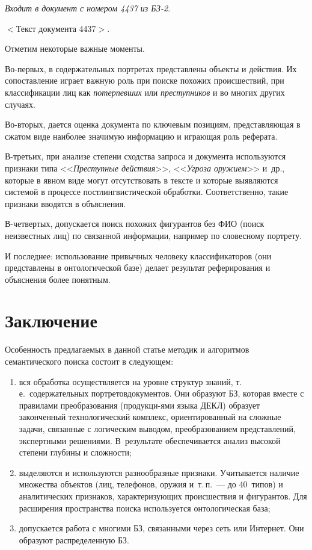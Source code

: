 \begin{multicols}{2}
     \textit{Входит в документ с номером 4437 из БЗ-2}.
     
    \noindent
     $<$Текст документа 4437$>$.
     
          \smallskip
     
    Отметим некоторые важные моменты.
    
    Во-первых, в содержательных портретах представлены объекты и 
действия. Их сопоставление играет важную роль при поиске похожих 
происшествий, при классификации лиц как \textit{потерпевших} или 
\textit{преступников} и во многих других случаях.
    
    Во-вторых, дается оценка документа по ключевым позициям, 
представляющая в сжатом виде наиболее значимую информацию и играющая 
роль реферата.
    
    В-третьих, при анализе степени сходства запроса и документа 
используются признаки типа <<\textit{Преступные действия}>>, <<\textit{Угроза 
оружием}>> и~др., которые в явном виде могут отсутствовать в тексте и 
которые выявляются системой в процессе постлингвистической обработки. 
Соответственно, такие признаки вводятся в объяснения.
    
    В-четвертых, допускается поиск похожих фигурантов без ФИО (поиск 
неизвестных лиц) по связанной информации, например по словесному 
портрету.
    
    И последнее: использование привычных человеку классификаторов (они 
представлены в онтологической базе) делает результат реферирования и 
объяснения более понятным.
    
\section{Заключение}
    
    Особенность предлагаемых в данной статье методик и алгоритмов 
семантического поиска состоит в следующем:
    \begin{enumerate}[(1)]
    \item вся обработка осуществляется на уровне структур знаний, т.\,е.\ 
содержательных портретов\linebreak документов. Они образуют БЗ, 
которая вмес\-те с правилами преобразования (продукци-\linebreak ями языка ДЕКЛ) 
образует законченный технологический комплекс, ориентированный на 
сложные задачи, связанные с логическим выводом, преобразованием 
пред\-став\-ле\-ний, экспертными решениями. В~результате обеспечивается анализ 
высокой степени глубины и сложности;
    \item выделяются и используются разнообразные признаки. Учитывается 
наличие множества объектов (лиц, телефонов, оружия и~т.\,п.~--- до 40~типов) 
и аналитических признаков, характеризующих происшествия и фигурантов. 
Для расширения пространства поиска используется онтологическая база;
    \item допускается работа с многими БЗ, связанными через сеть или 
Интернет. Они образуют распределенную БЗ.
    \end{enumerate}
    

\end{multicols}
